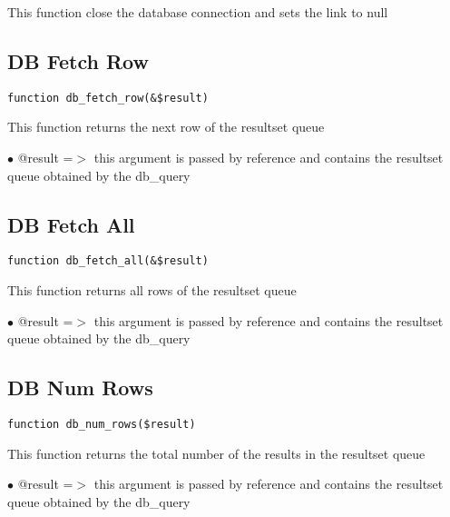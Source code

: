 \documentclass[a4paper]{book}
\begin{document}
This function close the database connection and sets the link to null

\hypertarget{toc62}{}
\subsection{DB Fetch Row}

\begin{lstlisting}
function db_fetch_row(&$result)
\end{lstlisting}

This function returns the next row of the resultset queue

\begin{compactitem}
\item[\color{myblue}$\bullet$] @result =$>$ this argument is passed by reference and contains the resultset queue
           obtained by the db\_query
\end{compactitem}

\hypertarget{toc63}{}
\subsection{DB Fetch All}

\begin{lstlisting}
function db_fetch_all(&$result)
\end{lstlisting}

This function returns all rows of the resultset queue

\begin{compactitem}
\item[\color{myblue}$\bullet$] @result =$>$ this argument is passed by reference and contains the resultset queue
           obtained by the db\_query
\end{compactitem}

\hypertarget{toc64}{}
\subsection{DB Num Rows}

\begin{lstlisting}
function db_num_rows($result)
\end{lstlisting}

This function returns the total number of the results in the resultset queue

\begin{compactitem}
\item[\color{myblue}$\bullet$] @result =$>$ this argument is passed by reference and contains the resultset queue
           obtained by the db\_query
\end{compactitem}
\end{document}
